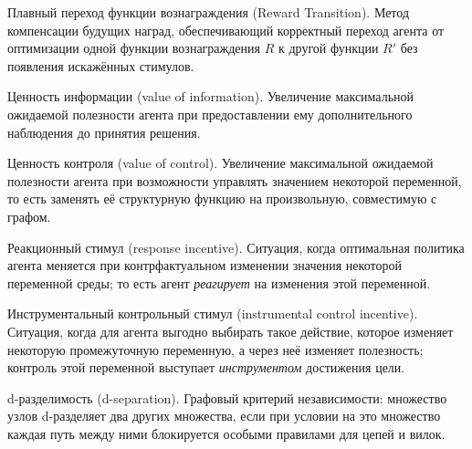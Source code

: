 \begin{definition}
    \label{def:transition}
    Плавный переход функции вознаграждения (Reward Transition). Метод компенсации 
    будущих наград, обеспечивающий корректный переход агента от оптимизации 
    одной функции вознаграждения $R$ к другой функции $R'$ без появления 
    искажённых стимулов.
\end{definition}



\begin{definition}
    \label{def:voi}
    Ценность информации (value of information). Увеличение максимальной 
    ожидаемой полезности агента при предоставлении ему дополнительного 
    наблюдения до принятия решения.
\end{definition}

\begin{definition}
    \label{def:voc}
    Ценность контроля (value of control). Увеличение максимальной ожидаемой 
    полезности агента при возможности управлять значением некоторой переменной, 
    то есть заменять её структурную функцию на произвольную, совместимую с графом.
\end{definition}

\begin{definition}
    \label{def:ri}
    Реакционный стимул (response incentive). Ситуация, когда оптимальная 
    политика агента меняется при контрфактуальном изменении значения 
    некоторой переменной среды; то есть агент \emph{реагирует} на изменения 
    этой переменной.
\end{definition}

\begin{definition}
    \label{def:ici}
    Инструментальный контрольный стимул (instrumental control incentive). 
    Ситуация, когда для агента выгодно выбирать такое действие, которое 
    изменяет некоторую промежуточную переменную, а через неё изменяет полезность;
    контроль этой переменной выступает \emph{инструментом} достижения цели.
\end{definition}

\begin{definition}
    \label{def:dsep}
    d-разделимость (d-separation). Графовый критерий независимости: множество 
    узлов d-разделяет два других множества, если при условии на это множество 
    каждая путь между ними блокируется особыми правилами для цепей и вилок.
\end{definition}



